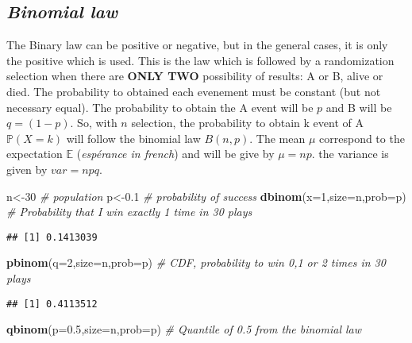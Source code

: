 \documentclass[
]{article}
\newenvironment{Shaded}{\begin{snugshade}}{\end{snugshade}}
\newcommand{\AttributeTok}[1]{\textcolor[rgb]{0.13,0.29,0.53}{#1}}
\newcommand{\CommentTok}[1]{\textcolor[rgb]{0.56,0.35,0.01}{\textit{#1}}}
\newcommand{\DecValTok}[1]{\textcolor[rgb]{0.00,0.00,0.81}{#1}}
\newcommand{\FloatTok}[1]{\textcolor[rgb]{0.00,0.00,0.81}{#1}}
\newcommand{\FunctionTok}[1]{\textcolor[rgb]{0.13,0.29,0.53}{\textbf{#1}}}
\newcommand{\NormalTok}[1]{#1}
\newcommand{\OtherTok}[1]{\textcolor[rgb]{0.56,0.35,0.01}{#1}}
\begin{document}
\hypertarget{binomial-law}{%
\subsection{\texorpdfstring{\emph{Binomial
law}}{Binomial law}}\label{binomial-law}}

The Binary law can be positive or negative, but in the general cases, it
is only the positive which is used. This is the law which is followed by
a randomization selection when there are \textbf{ONLY TWO} possibility
of results: A or B, alive or died. The probability to obtained each
evenement must be constant (but not necessary equal). The probability to
obtain the A event will be \(p\) and B will be \(q=(1-p)\). So, with
\(n\) selection, the probability to obtain k event of A
\(\mathbb{P}(X=k)\) will follow the binomial law \(B(n,p)\). The mean
\(\mu\) correspond to the expectation \(\mathbb{E}\) (\emph{espérance in
french}) and will be give by \(\mu=np\). the variance is given by
\(var=npq\).

\begin{Shaded}
\begin{Highlighting}[]
\NormalTok{n}\OtherTok{\textless{}{-}}\DecValTok{30} \CommentTok{\# population}
\NormalTok{p}\OtherTok{\textless{}{-}}\FloatTok{0.1} \CommentTok{\# probability of success}
\FunctionTok{dbinom}\NormalTok{(}\AttributeTok{x=}\DecValTok{1}\NormalTok{,}\AttributeTok{size=}\NormalTok{n,}\AttributeTok{prob=}\NormalTok{p) }\CommentTok{\# Probability that I win exactly 1 time in 30 plays}
\end{Highlighting}
\end{Shaded}

\begin{verbatim}
## [1] 0.1413039
\end{verbatim}

\begin{Shaded}
\begin{Highlighting}[]
\FunctionTok{pbinom}\NormalTok{(}\AttributeTok{q=}\DecValTok{2}\NormalTok{,}\AttributeTok{size=}\NormalTok{n,}\AttributeTok{prob=}\NormalTok{p) }\CommentTok{\# CDF, probability to win 0,1 or 2 times in 30 plays}
\end{Highlighting}
\end{Shaded}

\begin{verbatim}
## [1] 0.4113512
\end{verbatim}

\begin{Shaded}
\begin{Highlighting}[]
\FunctionTok{qbinom}\NormalTok{(}\AttributeTok{p=}\FloatTok{0.5}\NormalTok{,}\AttributeTok{size=}\NormalTok{n,}\AttributeTok{prob=}\NormalTok{p) }\CommentTok{\# Quantile of 0.5 from the binomial law}
\end{Highlighting}
\end{Shaded}
\end{document}

